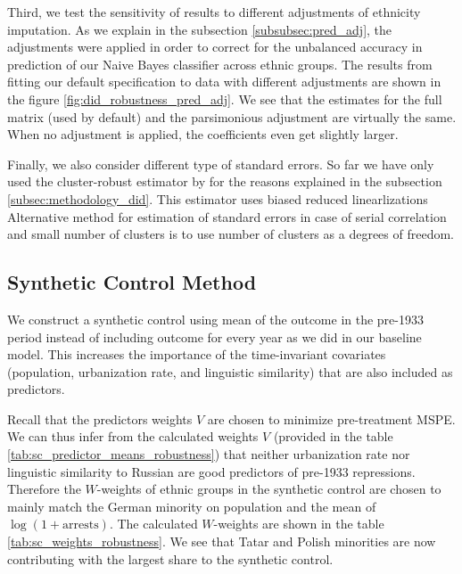 Third, we test the sensitivity of results to different adjustments of ethnicity imputation. 
As we explain in the subsection \ref{subsubsec:pred_adj}, the adjustments were applied in order to correct for the unbalanced accuracy in prediction of our Naive Bayes classifier across ethnic groups. The results from fitting our default specification to data with different adjustments are shown in the figure \ref{fig:did_robustness_pred_adj}.
We see that the estimates for the full matrix (used by default) and the parsimonious adjustment are virtually the same. When no adjustment is applied, the coefficients even get slightly larger. 


Finally, we also consider different type of standard errors. 
So far we have only used the cluster-robust estimator by \citet{pustejovsky_small-sample_2018} for the reasons explained in the subsection \ref{subsec:methodology_did}. 
This estimator uses biased reduced linearlizations
Alternative method for estimation of standard errors  in case of serial correlation and small number of clusters is to use number of clusters as a degrees of freedom. 
\subsection{Synthetic Control Method}
 We construct a synthetic control  using mean of the outcome in the pre-1933 period instead of including outcome for every year as we did in our baseline model. This increases the importance of the time-invariant covariates (population, urbanization rate, and linguistic similarity) that are also included as predictors.


Recall that the predictors weights $V$ are chosen to minimize pre-treatment MSPE. We can thus infer from the calculated  weights $V$ (provided in the table \ref{tab:sc_predictor_means_robustness})  that neither urbanization rate nor linguistic similarity to Russian are good predictors of pre-1933 repressions. 
Therefore the $W$-weights of ethnic groups in the synthetic control are chosen to mainly match the German minority on population and the mean of $\log\left(1 + \text{arrests}\right)$. 
 The calculated $W$-weights  are shown in the table \ref{tab:sc_weights_robustness}. We see that Tatar and Polish minorities are now contributing with the largest share to the synthetic control. 

